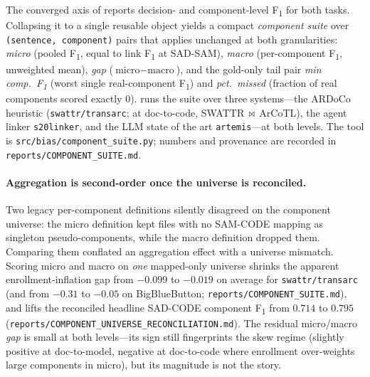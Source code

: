 \documentclass[11pt,a4paper]{report}
\newcommand{\sadcode}{SAD-CODE\xspace}
\newcommand{\sadsam}{SAD-SAM\xspace}
\newcommand{\samcode}{SAM-CODE\xspace}
\newcommand{\fone}{F\textsubscript{1}\xspace}
\begin{document}
The converged axis of  reports decision- and
component-level \fone for both tasks. Collapsing it to a single reusable object
yields a compact \emph{component suite} over \texttt{(sentence, component)}
pairs that applies unchanged at both granularities: \emph{micro} (pooled \fone,
equal to link \fone at \sadsam), \emph{macro} (per-component \fone, unweighted
mean), \emph{gap} ($\text{micro}-\text{macro}$), and the gold-only tail pair
\emph{min comp.\ \fone} (worst single real-component \fone) and \emph{pct.\
missed} (fraction of real components scored exactly $0$). 
runs the suite over three systems---the ARDoCo heuristic (\texttt{swattr/transarc};
at doc-to-code, SWATTR\,$\bowtie$\,ArCoTL), the agent linker \texttt{s20linker},
and the LLM state of the art \texttt{artemis}---at both levels. The tool is
\texttt{src/bias/component\_suite.py}; numbers and provenance are recorded in
\texttt{reports/COMPONENT\_SUITE.md}.



\paragraph{Aggregation is second-order once the universe is reconciled.}
Two legacy per-component definitions silently disagreed on the component
universe: the micro definition kept files with no \samcode mapping as singleton
pseudo-components, while the macro definition dropped them. Comparing them
conflated an aggregation effect with a universe mismatch. Scoring micro and
macro on \emph{one} mapped-only universe shrinks the apparent
enrollment-inflation gap from $-0.099$ to $-0.019$ on average for
\texttt{swattr/transarc} (and from $-0.31$ to $-0.05$ on BigBlueButton;
\texttt{reports/COMPONENT\_SUITE.md}), and lifts the reconciled headline
\sadcode component \fone from $0.714$ to $0.795$
(\texttt{reports/COMPONENT\_UNIVERSE\_RECONCILIATION.md}). The residual micro/macro
\emph{gap} is small at both levels---its sign still fingerprints the skew regime
(slightly positive at doc-to-model, negative at doc-to-code where enrollment
over-weights large components in micro), but its magnitude is not the story.
\end{document}

